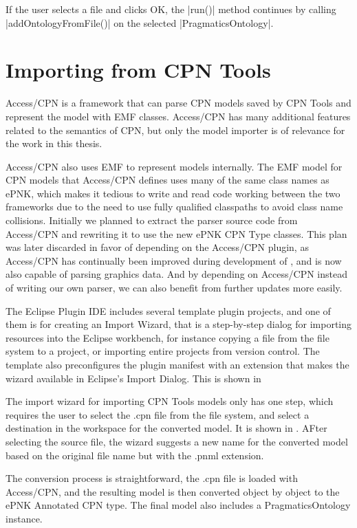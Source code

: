 If the user selects a file and clicks OK, the |run()| method continues by
calling |addOntologyFromFile()| on the selected |PragmaticsOntology|.


\section{Importing from CPN Tools}
Access/CPN is a framework that can parse CPN models saved by CPN Tools and
represent the model with EMF classes. Access/CPN has many additional features
related to the semantics of CPN, but only the model importer is of relevance for
the work in this thesis.

Access/CPN also uses EMF to represent models internally. The EMF model for CPN
models that Access/CPN defines uses many of the same class names as ePNK, which
makes it tedious to write and read code working between the two frameworks due
to the need to use fully qualified classpaths to avoid class name collisions.
Initially we planned to extract the parser source code from Access/CPN and
rewriting it to use the new ePNK CPN Type classes. This plan was later discarded
in favor of depending on the Access/CPN plugin, as Access/CPN has continually
been improved during development of \thename{}, and is now also capable of
parsing graphics data. And by depending on Access/CPN instead of writing our own
parser, we can also benefit from further updates more easily.

The Eclipse Plugin IDE includes several template plugin projects, and one of
them is for creating an Import Wizard, that is a step-by-step dialog for
importing resources into the Eclipse workbench, for instance copying a file from
the file system to a project, or importing entire projects from version control.
The template also preconfigures the plugin manifest with an extension that makes
the wizard available in Eclipse's Import Dialog. This is shown in

The import wizard for importing CPN Tools models only has one step, which
requires the user to select the .cpn file from the file system, and select a
destination in the workspace for the converted model. It is shown in
. AFter selecting the source file, the wizard suggests a
new name for the converted model based on the original file name but with the
.pnml extension.

The conversion process is straightforward, the .cpn file is loaded with
Access/CPN, and the resulting model is then converted object by object to the
ePNK Annotated CPN type. The final model also includes a PragmaticsOntology
instance.

